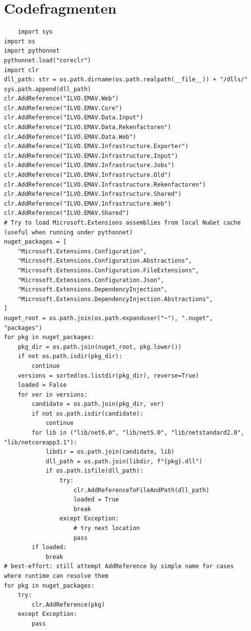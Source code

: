 \section{Codefragmenten}
\label{ch:codefragmenten}

\begin{listing}[H]
   \caption[db aanspreken via pythonnet]{De input en rekenfactor database aanspreken via pythonnet (onsuccesvol)}
  \label{lst:inputrepoaanspreken}
\end{listing}

 \begin{verbatim}
    import sys
import os
import pythonnet
pythonnet.load("coreclr")
import clr
dll_path: str = os.path.dirname(os.path.realpath(__file__)) + "/dlls/"
sys.path.append(dll_path)
clr.AddReference("ILVO.EMAV.Web")
clr.AddReference("ILVO.EMAV.Core")
clr.AddReference("ILVO.EMAV.Data.Input")
clr.AddReference("ILVO.EMAV.Data.Rekenfactoren")
clr.AddReference("ILVO.EMAV.Data.Web")
clr.AddReference("ILVO.EMAV.Infrastructure.Exporter")
clr.AddReference("ILVO.EMAV.Infrastructure.Input")
clr.AddReference("ILVO.EMAV.Infrastructure.Jobs")
clr.AddReference("ILVO.EMAV.Infrastructure.Old")
clr.AddReference("ILVO.EMAV.Infrastructure.Rekenfactoren")
clr.AddReference("ILVO.EMAV.Infrastructure.Shared")
clr.AddReference("ILVO.EMAV.Infrastructure.Web")
clr.AddReference("ILVO.EMAV.Shared")
# Try to load Microsoft.Extensions assemblies from local NuGet cache (useful when running under pythonnet)
nuget_packages = [
    "Microsoft.Extensions.Configuration",
    "Microsoft.Extensions.Configuration.Abstractions",
    "Microsoft.Extensions.Configuration.FileExtensions",
    "Microsoft.Extensions.Configuration.Json",
    "Microsoft.Extensions.DependencyInjection",
    "Microsoft.Extensions.DependencyInjection.Abstractions",
]
nuget_root = os.path.join(os.path.expanduser("~"), ".nuget", "packages")
for pkg in nuget_packages:
    pkg_dir = os.path.join(nuget_root, pkg.lower())
    if not os.path.isdir(pkg_dir):
        continue
    versions = sorted(os.listdir(pkg_dir), reverse=True)
    loaded = False
    for ver in versions:
        candidate = os.path.join(pkg_dir, ver)
        if not os.path.isdir(candidate):
            continue
        for lib in ("lib/net6.0", "lib/net5.0", "lib/netstandard2.0", "lib/netcoreapp3.1"):
            libdir = os.path.join(candidate, lib)
            dll_path = os.path.join(libdir, f"{pkg}.dll")
            if os.path.isfile(dll_path):
                try:
                    clr.AddReferenceToFileAndPath(dll_path)
                    loaded = True
                    break
                except Exception:
                    # try next location
                    pass
        if loaded:
            break
# best-effort: still attempt AddReference by simple name for cases where runtime can resolve them
for pkg in nuget_packages:
    try:
        clr.AddReference(pkg)
    except Exception:
        pass


\end{verbatim}
